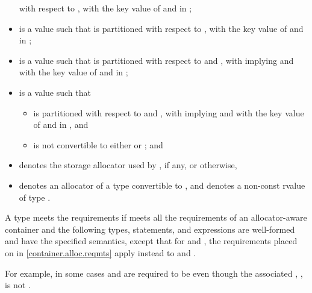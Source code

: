 \begin{itemize}
with respect to ,
with  the key value of  and  in ;
\item
{} is a value such that  is partitioned with respect to
,
with  the key value of  and  in ;
\item
{} is a value such that  is partitioned with respect to
 and , with  implying
 and
with  the key value of  and  in ;
\item
{} is a value such that
\begin{itemize}
\item
{} is partitioned with respect to  and ,
with  implying  and
with  the key value of  and  in , and
\item
{} is not convertible to
either  or ; and
\end{itemize}
\item
{} denotes the storage allocator used by , if any, or  otherwise,
\item
{} denotes an allocator of a type convertible to ,
and  denotes a non-const rvalue of type .
\end{itemize}

\pnum
A type  meets the  requirements
if  meets all the requirements of an allocator-aware
container and
the following types, statements, and expressions are well-formed and
have the specified semantics,
except that for
 and , the requirements placed on 
in \ref{container.alloc.reqmts} apply instead to 
and .
\begin{note}
For example, in some cases  and 
are required to be  even though the associated
, , is not
.
\end{note}

\newcommand{\indexordmem}[1]{%
\indexlibrary{\idxcode{#1}!ordered associative containers}%
\indexlibrary{\idxcode{set}!\idxcode{#1}}%
\indexlibrary{\idxcode{map}!\idxcode{#1}}%
\indexlibrary{\idxcode{multiset}!\idxcode{#1}}%
\indexlibrary{\idxcode{multimap}!\idxcode{#1}}%
}

